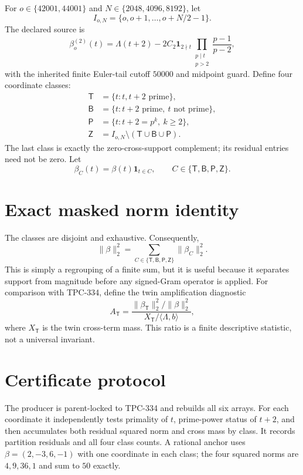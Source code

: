 \documentclass[10pt]{article}
\newcommand{\ind}{\mathbf 1}
\begin{document}
For $o\in\{42001,44001\}$ and
$N\in\{2048,4096,8192\}$, let
\[
 I_{o,N}=\{o,o+1,\ldots,o+N/2-1\}.
\]
The declared source is
\begin{equation}\label{eq:source}
 \beta_o^{(2)}(t)=\Lambda(t+2)-2C_2\ind_{2\nmid t}
 \prod_{\substack{p\mid t\\p>2}}\frac{p-1}{p-2},
\end{equation}
with the inherited finite Euler-tail cutoff $50000$ and midpoint guard.
Define four coordinate classes:
\begin{align*}
 \mathsf T&=\{t:t,t+2\text{ prime}\},\\
 \mathsf B&=\{t:t+2\text{ prime},\ t\text{ not prime}\},\\
 \mathsf P&=\{t:t+2=p^k,\ k\ge2\},\\
 \mathsf Z&=I_{o,N}\setminus(\mathsf T\cup\mathsf B\cup\mathsf P).
\end{align*}
The last class is exactly the zero-cross-support complement; its residual
entries need not be zero.  Let
\[
 \beta_C(t)=\beta(t)\ind_{t\in C},\qquad C\in\{\mathsf T,\mathsf B,\mathsf P,\mathsf Z\}.
\]

\section{Exact masked norm identity}

The classes are disjoint and exhaustive.  Consequently,
\begin{equation}\label{eq:normsplit}
 \|\beta\|_2^2=\sum_{C\in\{\mathsf T,\mathsf B,\mathsf P,\mathsf Z\}}
 \|\beta_C\|_2^2.
\end{equation}
This is simply a regrouping of a finite sum, but it is useful because it
separates support from magnitude before any signed-Gram operator is applied.
For comparison with TPC-334, define the twin amplification diagnostic
\[
 A_{\mathsf T}=
 \frac{\|\beta_{\mathsf T}\|_2^2/\|\beta\|_2^2}
 {X_{\mathsf T}/\langle\Lambda,b\rangle},
\]
where $X_{\mathsf T}$ is the twin cross-term mass.  This ratio is a finite
descriptive statistic, not a universal invariant.

\section{Certificate protocol}

The producer is parent-locked to TPC-334 and rebuilds all six arrays.  For
each coordinate it independently tests primality of $t$, prime-power status
of $t+2$, and then accumulates both residual squared norm and cross mass by
class.  It records partition residuals and all four class counts.  A rational
anchor uses $\beta=(2,-3,6,-1)$ with one coordinate in each class; the four
squared norms are $4,9,36,1$ and sum to $50$ exactly.
\end{document}

